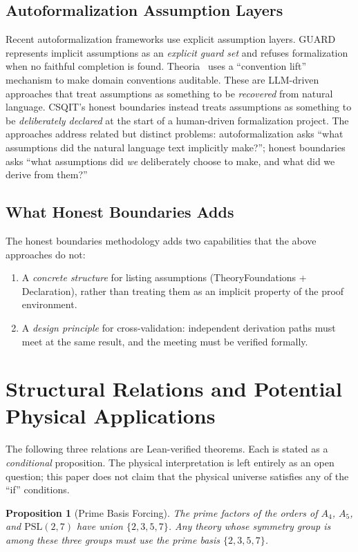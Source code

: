 ﻿\documentclass[11pt]{article}
\newtheorem{proposition}[theorem]{Proposition}
\begin{document}
\subsection{Autoformalization Assumption Layers}
Recent autoformalization frameworks use explicit assumption
layers. GUARD~\cite{quan2026} represents implicit assumptions
as an \emph{explicit guard set} and refuses formalization
when no faithful completion is found. Theoria~\cite{saldivar2026}
uses a ``convention lift'' mechanism to make domain
conventions auditable. These are LLM-driven approaches that
treat assumptions as something to be \emph{recovered} from
natural language. CSQIT's honest boundaries instead treats
assumptions as something to be \emph{deliberately declared}
at the start of a human-driven formalization project. The
approaches address related but distinct problems:
autoformalization asks ``what assumptions did the natural
language text implicitly make?''; honest boundaries asks
``what assumptions did \emph{we} deliberately choose to
make, and what did we derive from them?''

\subsection{What Honest Boundaries Adds}
The honest boundaries methodology adds two capabilities that
the above approaches do not:
\begin{enumerate}
\item A \emph{concrete structure} for listing assumptions
  (TheoryFoundations + Declaration), rather than treating
  them as an implicit property of the proof environment.
\item A \emph{design principle} for cross-validation:
  independent derivation paths must meet at the same result,
  and the meeting must be verified formally.
\end{enumerate}

\section{Structural Relations and Potential Physical Applications}
\label{sec:relations}

The following three relations are Lean-verified theorems.
Each is stated as a \emph{conditional} proposition. The
physical interpretation is left entirely as an open
question; this paper does not claim that the physical
universe satisfies any of the ``if'' conditions.

\begin{proposition}[Prime Basis Forcing]
\label{prop:forcing}
The prime factors of the orders of $A_4$, $A_5$, and
$\mathrm{PSL}(2,7)$ have union $\{2,3,5,7\}$. Any theory
whose symmetry group is among these three groups must use
the prime basis $\{2,3,5,7\}$.
\end{proposition}
\end{document}
